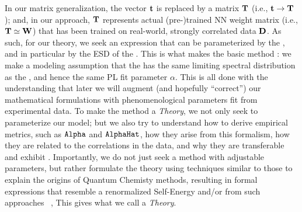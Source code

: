 In our matrix generalization, the \Teacher vector ${\mathbf{t}}$ is replaced by a \Teacher matrix ${\mathbf{T}}$ (i.e., ${\mathbf{t}}\rightarrow{\mathbf{T}}$); 
and, in our \SETOL approach, ${\mathbf{T}}$ represents actual (pre-)trained NN weight matrix (i.e., ${\mathbf{T}}\simeq{\mathbf{W}}$) that has been trained on real-world, strongly correlated data $\mathbf{D}$.
As such, for our \SETOL theory, we seek an expression that can be parameterized by the \Teacher, and in particular by the ESD of the \Teacher.
This is what makes the basic method \SemiEmpirical: 
we make a modeling assumption that the \Teacher has the same limiting spectral distribution as the \Student, 
and hence the same PL fit parameter $\alpha$. 
This is all done with the understanding that later we will augment
(and hopefully ``correct'') our mathematical formulations with 
phenomenological parameters fit from experimental data.
To make the \SemiEmpirical method a \SemiEmpirical \emph{Theory}, 
we not only seek to parameterize our model; but we also try to understand 
how to derive \HTSR empirical metrics, such as $\texttt{Alpha}$ and $\texttt{AlphaHat}$,
how they arise from this formalism, 
how they are related to the correlations in the data, and 
why they are transferable and exhibit \Universality.
Importantly, we do not just seek a method with adjustable parameters, but rather formulate the theory using
techniques similar to those to explain the origins of Quantum Chemisty \SemiEmpirical methods, resulting in formal
expressions that resemble a renormalized Self-Energy
and/or \EffectiveHamiltonian from such approaches
~\cite{Martin1994,Martin1996_CPL,MartinFreed1996, Brandow1965, freed1977, Freed1983, PhysRevLett.69.800},
This gives what we call a \SemiEmpirical \emph{Theory}.

